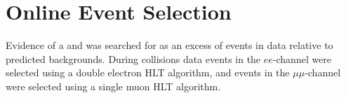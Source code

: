 

%


\section{Online Event Selection}
\label{sec:triggers}
Evidence of a \WR and \nul was searched for as an excess of events in data relative to predicted backgrounds.  During collisions 
data events in the $ee$-channel were selected using a double electron HLT algorithm, and events in the $\mu\mu$-channel were 
selected using a single muon HLT algorithm.

